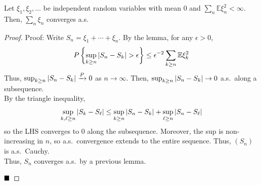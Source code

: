 \begin{lemma}
    Let $\xi_1, \xi_2, \ldots$ be independent random variables with mean $0$ and $\sum_n \mathbb{E}\xi_n^2 < \infty$. Then, $\sum_n \xi_n$ converges a.s.
\end{lemma}
\begin{proof}{Proof:}
    Write $S_n = \xi_1 + \cdots + \xi_n$. By the lemma, for any $\epsilon > 0$,
    \[ P\left\{\sup_{k \geq n} \left\lvert {S_n - S_k} \right\rvert > \epsilon\right\} \leq \epsilon^{-2}\sum_{k \geq n} \mathbb{E}\xi_k^2 \]
    Thus, $\sup_{k \geq n} \left\lvert {S_n - S_k} \right\rvert \xrightarrow{P} 0$ as $n \to \infty$. Then, $\sup_{k \geq n} \left\lvert {S_n - S_k} \right\rvert \to 0$ a.s.\ along a subsequence.\\

    By the triangle inequality,
    \[ \sup_{k, \ell \geq n} \left\lvert {S_k - S_{\ell}} \right\rvert \leq \sup_{k \geq n} \left\lvert {S_n - S_k} \right\rvert + \sup_{\ell \geq n} \left\lvert {S_n - S_{\ell}} \right\rvert \]
    so the LHS converges to $0$ along the subsequence. Moreover, the sup is non-increasing in $n$, so a.s.\ convergence extends to the entire sequence. Thus, $(S_n)$ is a.s.\ Cauchy.\\

    Thus, $S_n$ converges a.s.\ by a previous lemma.

    $\qed$
\end{proof}

